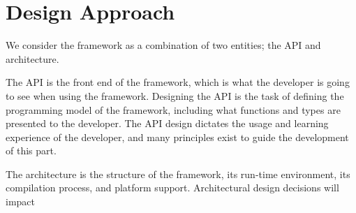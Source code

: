 \section{Design Approach}
We consider the framework as a combination of two entities; the API and architecture.

The API is the front end of the framework, which is what the developer is going to see when using the framework. Designing the API is the task of defining the programming model of the framework, including what functions and types are presented to the developer. The API design dictates the usage and learning experience of the developer, and many principles exist to guide the development of this part. 

The architecture is the structure of the framework, its run-time environment, its compilation process, and platform support. Architectural design decisions will impact 


